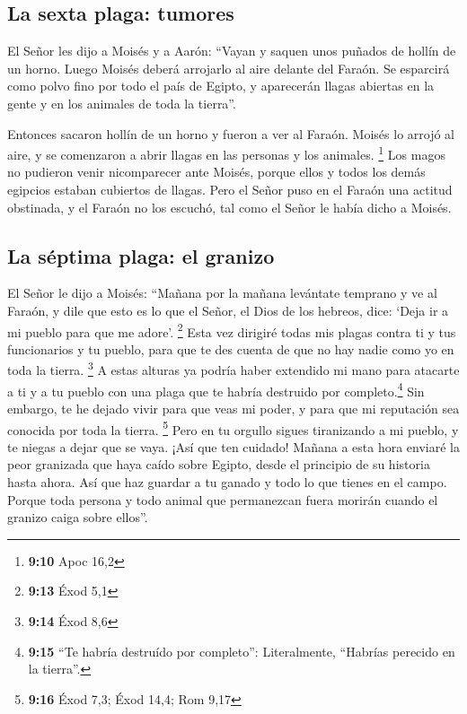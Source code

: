 \hypertarget{la-sexta-plaga-tumores}{%
\subsection{La sexta plaga: tumores}\label{la-sexta-plaga-tumores}}

 El Señor les dijo a Moisés y a Aarón: ``Vayan y saquen
unos puñados de hollín de un horno. Luego Moisés deberá arrojarlo al
aire delante del Faraón.  Se esparcirá como polvo fino por
todo el país de Egipto, y aparecerán llagas abiertas en la gente y en
los animales de toda la tierra''.

 Entonces sacaron hollín de un horno y fueron a ver al
Faraón. Moisés lo arrojó al aire, y se comenzaron a abrir llagas en las
personas y los animales. \footnote{\textbf{9:10} Apoc 16,2}
 Los magos no pudieron venir nicomparecer ante Moisés,
porque ellos y todos los demás egipcios estaban cubiertos de llagas.
 Pero el Señor puso en el Faraón una actitud obstinada, y
el Faraón no los escuchó, tal como el Señor le había dicho a Moisés.

\hypertarget{la-suxe9ptima-plaga-el-granizo}{%
\subsection{La séptima plaga: el
granizo}\label{la-suxe9ptima-plaga-el-granizo}}

 El Señor le dijo a Moisés: ``Mañana por la mañana
levántate temprano y ve al Faraón, y dile que esto es lo que el Señor,
el Dios de los hebreos, dice: `Deja ir a mi pueblo para que me adore'.
\footnote{\textbf{9:13} Éxod 5,1}  Esta vez dirigiré
todas mis plagas contra ti y tus funcionarios y tu pueblo, para que te
des cuenta de que no hay nadie como yo en toda la tierra. \footnote{\textbf{9:14}
  Éxod 8,6}  A estas alturas ya podría haber extendido mi
mano para atacarte a ti y a tu pueblo con una plaga que te habría
destruido por completo.\footnote{\textbf{9:15} ``Te habría destruído por
  completo'': Literalmente, ``Habrías perecido en la tierra''.}
 Sin embargo, te he dejado vivir para que veas mi poder,
y para que mi reputación sea conocida por toda la tierra. \footnote{\textbf{9:16}
  Éxod 7,3; Éxod 14,4; Rom 9,17}  Pero en tu orgullo
sigues tiranizando a mi pueblo, y te niegas a dejar que se vaya.
 ¡Así que ten cuidado! Mañana a esta hora enviaré la peor
granizada que haya caído sobre Egipto, desde el principio de su historia
hasta ahora.  Así que haz guardar a tu ganado y todo lo
que tienes en el campo. Porque toda persona y todo animal que
permanezcan fuera morirán cuando el granizo caiga sobre ellos''.


